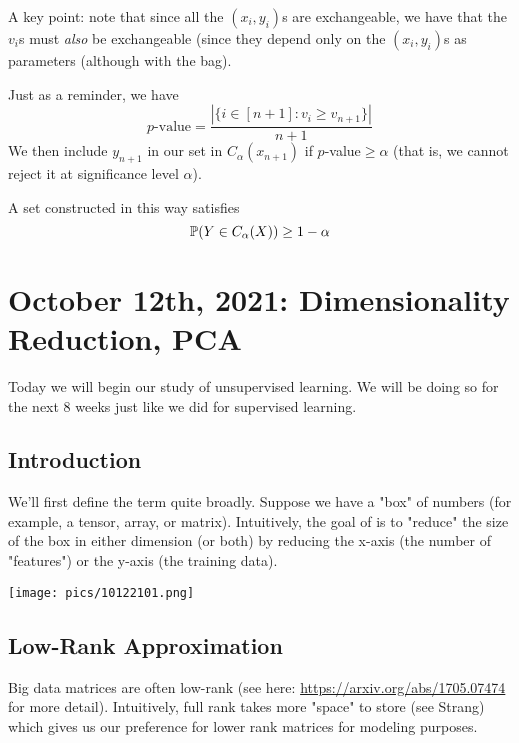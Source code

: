 \documentclass[11pt]{scrartcl}
\begin{document}
\begin{remark}
A key point: note that since all the $(x_i,y_i)$s are exchangeable, we have that the $v_i$s must \textit{also} be exchangeable (since they depend only on the $(x_i,y_i)$s as parameters (although with the bag).
\end{remark}

Just as a reminder, we have 
$$p\text{-value}=\frac{|\{i \in [n+1]: v_i \ge v_{n+1}\}|}{n+1}$$
We then include $y_{n+1}$ in our set in $C_\alpha(x_{n+1})$ if $p$-value$\ge \alpha$ (that is, we cannot reject it at significance level $\alpha$). 

\begin{thm}[Vovk et. al]
A set constructed in this way satisfies $$\mathbb{P}(Y \in C_\alpha(X)) \ge 1-\alpha$$
\end{thm}

\newpage

\section{October 12th, 2021: Dimensionality Reduction, PCA}

Today we will begin our study of unsupervised learning. We will be doing so for the next 8 weeks just like we did for supervised learning.

\subsection{Introduction}

We'll first define the term quite broadly. Suppose we have a "box" of numbers (for example, a tensor, array, or matrix). Intuitively, the goal of  is to "reduce" the size of the box in either dimension (or both) by reducing the x-axis (the number of "features") or the y-axis (the training data). 
\begin{center}
    \texttt{[image: pics/10122101.png]}
\end{center}

\subsection{Low-Rank Approximation}

Big data matrices are often low-rank (see here: \url{https://arxiv.org/abs/1705.07474} for more detail). Intuitively, full rank takes more "space" to store (see Strang) which gives us our preference for lower rank matrices for modeling purposes. 
\end{document}
